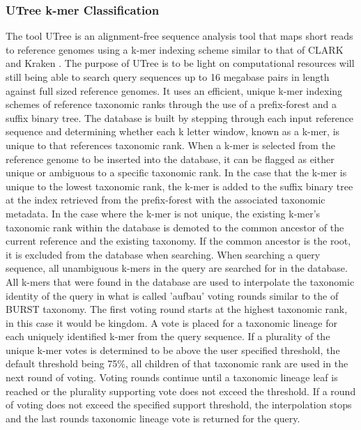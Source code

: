 \subsubsection{UTree k-mer Classification}

The tool UTree is an alignment-free sequence analysis tool that maps short reads to reference genomes using a k-mer indexing scheme similar to that of CLARK \cite{ounit_higher_2015} and Kraken \cite{wood_kraken:_2014}. The purpose of UTree is to be light on computational resources will still being able to search query sequences up to 16 megabase pairs in length against full sized reference genomes. It uses an efficient, unique k-mer indexing schemes of reference taxonomic ranks through the use of a prefix-forest and a suffix binary tree. The database is built by stepping through each input reference sequence and determining whether each k letter window, known as a k-mer, is unique to that references taxonomic rank. When a k-mer is selected from the reference genome to be inserted into the database, it can be flagged as either unique or ambiguous to a specific taxonomic rank. In the case that the k-mer is unique to the lowest taxonomic rank, the k-mer is added to the suffix binary tree at the index retrieved from the prefix-forest with the associated taxonomic metadata. In the case where the k-mer is not unique, the existing k-mer's taxonomic rank within the database is demoted to the common ancestor of the current reference and the existing taxonomy. If the common ancestor is the root, it is excluded from the database when searching. When searching a query sequence, all unambiguous k-mers in the query are searched for in the database. All k-mers that were found in the database are used to interpolate the taxonomic identity of the query in what is called 'aufbau' voting rounds similar to the of BURST taxonomy. The first voting round starts at the highest taxonomic rank, in this case it would be kingdom. A vote is placed for a taxonomic lineage for each uniquely identified k-mer from the query sequence. If a plurality of the unique k-mer votes is determined to be above the user specified threshold, the default threshold being 75\%, all children of that taxonomic rank are used in the next round of voting. Voting rounds continue until a taxonomic lineage leaf is reached or the plurality supporting vote does not exceed the threshold. If a round of voting does not exceed the specified support threshold, the interpolation stops and the last rounds taxonomic lineage vote is returned for the query.

